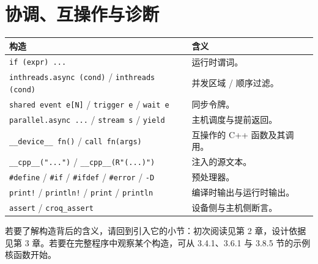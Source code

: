 \section{协调、互操作与诊断}
\begin{table}[htbp]\centering\small
\begin{tabularx}{\linewidth}{@{}lX@{}}
\toprule
构造 & 含义 \\
\midrule
\texttt{if (expr) ... } & 运行时谓词。 \\
\texttt{inthreads.async (cond)} / \texttt{inthreads (cond)} & 并发区域 / 顺序过滤。 \\
\texttt{shared event e[N]} / \texttt{trigger e} / \texttt{wait e} & 同步令牌。 \\
\texttt{parallel.async ...} / \texttt{stream s} / \texttt{yield} & 主机调度与提前返回。 \\
\texttt{\_\_device\_\_ fn()} / \texttt{call fn(args)} & 互操作的 C++ 函数及其调用。 \\
\texttt{\_\_cpp\_\_("...")} / \texttt{\_\_cpp\_\_(R"(...)")} & 注入的源文本。 \\
\texttt{\#define} / \texttt{\#if} / \texttt{\#ifdef} / \texttt{\#error} / \texttt{-D} & 预处理器。 \\
\texttt{print!} / \texttt{println!} / \texttt{print} / \texttt{println} & 编译时输出与运行时输出。 \\
\texttt{assert} / \texttt{croq\_assert} & 设备侧与主机侧断言。 \\
\bottomrule
\end{tabularx}
\end{table}

若要了解构造背后的含义，请回到引入它的小节：初次阅读见第 2 章，设计依据见第 3 章。若要在完整程序中观察某个构造，可从 3.4.1、3.6.1 与 3.8.5 节的示例核函数开始。

